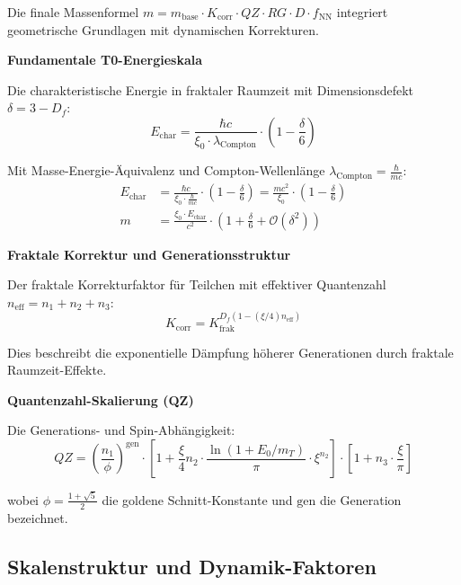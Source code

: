 	Die finale Massenformel $m = m_{\text{base}} \cdot K_{\text{corr}} \cdot QZ \cdot RG \cdot D \cdot f_{\text{NN}}$ integriert geometrische Grundlagen mit dynamischen Korrekturen.
	
	\textbf{Fundamentale T0-Energieskala}
	
	Die charakteristische Energie in fraktaler Raumzeit mit Dimensionsdefekt $\delta = 3 - D_f$:
	\begin{equation}
		E_{\text{char}} = \frac{\hbar c}{\xi_0 \cdot \lambda_{\text{Compton}}} \cdot \left(1 - \frac{\delta}{6}\right)
	\end{equation}
	
	Mit Masse-Energie-Äquivalenz und Compton-Wellenlänge $\lambda_{\text{Compton}} = \frac{\hbar}{mc}$:
	\begin{align}
		E_{\text{char}} &= \frac{\hbar c}{\xi_0 \cdot \frac{\hbar}{mc}} \cdot \left(1 - \frac{\delta}{6}\right) = \frac{mc^2}{\xi_0} \cdot \left(1 - \frac{\delta}{6}\right) \\
		m &= \frac{\xi_0 \cdot E_{\text{char}}}{c^2} \cdot \left(1 + \frac{\delta}{6} + \mathcal{O}(\delta^2)\right)
	\end{align}
	
	\textbf{Fraktale Korrektur und Generationsstruktur}
	
	Der fraktale Korrekturfaktor für Teilchen mit effektiver Quantenzahl $n_{\text{eff}} = n_1 + n_2 + n_3$:
	\begin{equation}
		K_{\text{corr}} = K_{\text{frak}}^{D_f (1 - (\xi/4) n_{\text{eff}})}
	\end{equation}
	
	Dies beschreibt die exponentielle Dämpfung höherer Generationen durch fraktale Raumzeit-Effekte.
	
	\textbf{Quantenzahl-Skalierung (QZ)}
	
	Die Generations- und Spin-Abhängigkeit:
	\begin{equation}
		QZ = \left(\frac{n_1}{\phi}\right)^{\text{gen}} \cdot \left[1 + \frac{\xi}{4} n_2 \cdot \frac{\ln(1 + E_0 / m_T)}{\pi} \cdot \xi^{n_2}\right] \cdot \left[1 + n_3 \cdot \frac{\xi}{\pi}\right]
	\end{equation}
	
	wobei $\phi = \frac{1+\sqrt{5}}{2}$ die goldene Schnitt-Konstante und $\text{gen}$ die Generation bezeichnet.
	
	\subsection{Skalenstruktur und Dynamik-Faktoren}
	
